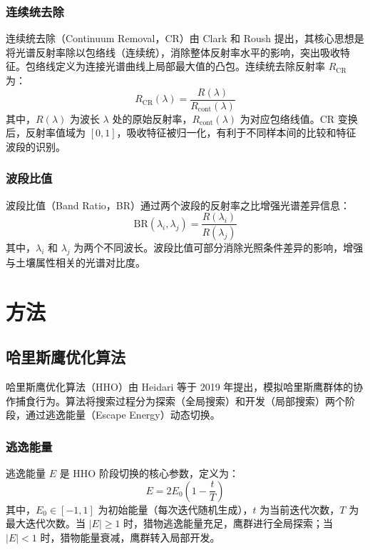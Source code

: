 \documentclass[12pt,a4paper]{article}
\begin{document}
\subsubsection{连续统去除}

连续统去除（Continuum Removal，CR）由 Clark 和 Roush 提出，其核心思想是将光谱反射率除以包络线（连续统），消除整体反射率水平的影响，突出吸收特征。包络线定义为连接光谱曲线上局部最大值的凸包。连续统去除反射率 $R_{\mathrm{CR}}$ 为：
\begin{equation}
    R_{\mathrm{CR}}(\lambda) = \frac{R(\lambda)}{R_{\mathrm{cont}}(\lambda)}
    \label{eq:cr}
\end{equation}
其中，$R(\lambda)$ 为波长 $\lambda$ 处的原始反射率，$R_{\mathrm{cont}}(\lambda)$ 为对应包络线值。CR 变换后，反射率值域为 $[0, 1]$，吸收特征被归一化，有利于不同样本间的比较和特征波段的识别。

\subsubsection{波段比值}

波段比值（Band Ratio，BR）通过两个波段的反射率之比增强光谱差异信息：
\begin{equation}
    \mathrm{BR}(\lambda_i, \lambda_j) = \frac{R(\lambda_i)}{R(\lambda_j)}
    \label{eq:br}
\end{equation}
其中，$\lambda_i$ 和 $\lambda_j$ 为两个不同波长。波段比值可部分消除光照条件差异的影响，增强与土壤属性相关的光谱对比度。


\section{方法}
\label{sec:method}

\subsection{哈里斯鹰优化算法}

哈里斯鹰优化算法（HHO）由 Heidari 等于 2019 年提出，模拟哈里斯鹰群体的协作捕食行为。算法将搜索过程分为探索（全局搜索）和开发（局部搜索）两个阶段，通过逃逸能量（Escape Energy）动态切换。

\subsubsection{逃逸能量}

逃逸能量 $E$ 是 HHO 阶段切换的核心参数，定义为：
\begin{equation}
    E = 2E_0\left(1 - \frac{t}{T}\right)
    \label{eq:hho_energy}
\end{equation}
其中，$E_0 \in [-1, 1]$ 为初始能量（每次迭代随机生成），$t$ 为当前迭代次数，$T$ 为最大迭代次数。当 $|E| \geq 1$ 时，猎物逃逸能量充足，鹰群进行全局探索；当 $|E| < 1$ 时，猎物能量衰减，鹰群转入局部开发。
\end{document}
